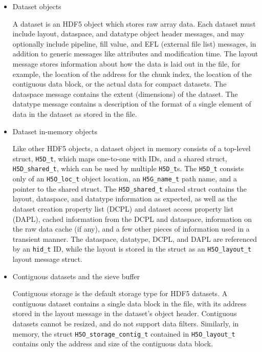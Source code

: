 \begin{itemize}
    \item Dataset objects

A dataset is an HDF5 object which stores raw array data. Each dataset must include layout, dataspace, and datatype object header messages, and may optionally include pipeline, fill value, and EFL (external file list) messages, in addition to generic messages like attributes and modification time. The layout message stores information about how the data is laid out in the file, for example, the location of the address for the chunk index, the location of the contiguous data block, or the actual data for compact datasets. The dataspace message contains the extent (dimensions) of the dataset. The datatype message contains a description of the format of a single element of data in the dataset as stored in the file.

    \item Dataset in-memory objects

Like other HDF5 objects, a dataset object in memory consists of a top-level struct, \texttt{H5D\_t}, which maps one-to-one with IDs, and a shared struct, \texttt{H5D\_shared\_t}, which can be used by multiple \texttt{H5D\_t}s. The \texttt{H5D\_t} consists only of an \texttt{H5O\_loc\_t} object location, an \texttt{H5G\_name\_t} path name, and a pointer to the shared struct. The \texttt{H5D\_shared\_t} shared struct contains the layout, dataspace, and datatype information as expected, as well as the dataset creation property list (DCPL) and dataset access property list (DAPL), cached information from the DCPL and dataspace, information on the raw data cache (if any), and a few other pieces of information used in a transient manner. The dataspace, datatype, DCPL, and DAPL are referenced by an \texttt{hid\_t} ID, while the layout is stored in the struct as an \texttt{H5O\_layout\_t} layout message struct.

    \item Contiguous datasets and the sieve buffer

Contiguous storage is the default storage type for HDF5 datasets. A contiguous dataset contains a single data block in the file, with its address stored in the layout message in the dataset's object header. Contiguous datasets cannot be resized, and do not support data filters. Similarly, in memory, the struct \texttt{H5O\_storage\_contig\_t} contained in \texttt{H5O\_layout\_t} contains only the address and size of the contiguous data block.


\end{itemize}
